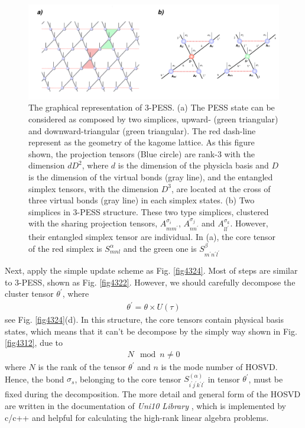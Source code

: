 \label{5pess}
\begin{figure}[ht]
	\centering
	\includegraphics[width=1.00\textwidth]{figures/fig4323.png}
	\caption[The graphical representation of 3-PESS]{The graphical representation of 3-PESS. (a) The PESS state can be considered as composed by two simplices, upward- (green triangular) and downward-triangular (green triangular). The red dash-line represent as the geometry of the kagome lattice. As this figure shown, the projection tensors (Blue circle) are rank-3 with the dimension $dD^2$, where $d$ is the dimension of the physicla basis and $D$ is the dimension of the virtual bonds (gray line), and the entangled simplex tensors, with the dimension $D^3$, are located at the cross of three virtual bonds (gray line) in each simplex states. (b) Two simplices in 3-PESS structure. These two type simplices, clustered with the sharing projection tensors, $A^{\sigma_i}_{mm^{\prime}}$, $A^{\sigma_j}_{nn^{\prime}}$ and $A^{\sigma_k}_{ll^{\prime}}$. However, their entangled simplex tensor are individual. In (a), the core tensor of the red simplex is $S^{\alpha}_{mnl}$ and the green one is $S^{\beta}_{m^{\prime}n^{\prime}l^{\prime}}$}
	\label{fig4323}
\end{figure}
Next, apply the simple update scheme as Fig. \ref{fig4324}. Most of steps are similar to 3-PESS, shown as Fig. \ref{fig4322}. However, we should carefully decompose the cluster tensor $\theta^{\prime}$, where
\begin{align}
	\theta^{\prime} = \theta \times U(\tau)
\end{align}
see Fig. \ref{fig4324}(d). In this structure, the core tensors contain physical basis states, which means that it can't be decompose by the simply way shown in Fig. \ref{fig4312}, due to
\begin{align}
	N \mod n \neq 0
\end{align}
where $N$ is the rank of the tensor $\theta^{\prime}$ and $n$ is the mode number of HOSVD. Hence, the bond $\sigma_s$, belonging to the core tensor $S^{(\alpha)}_{i^{\prime}j^{\prime}k^{\prime}l^{\prime}}$ in tensor $\theta^{\prime}$, must be fixed during the decomposition. The more detail and general form of the HOSVD are written in the documentation of \textit{Uni10 Library} \cite{}, which is implemented by c/c++ and helpful for calculating the high-rank linear algebra problems.
